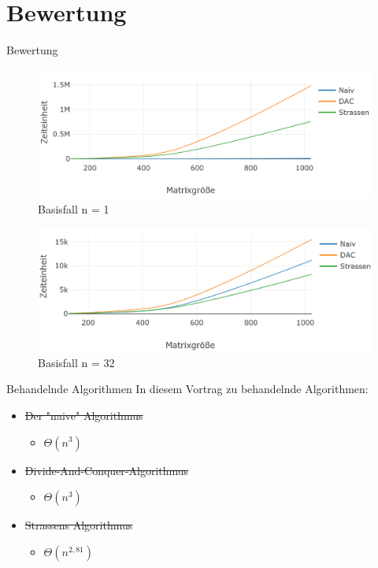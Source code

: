 \documentclass[aspectratio=169]{beamer}
\begin{document}
\section{Bewertung}
\begin{frame}{Bewertung}

     {
        \begin{figure}[H]
            \centering
            \includegraphics[width=\linewidth]{basisfallnot.png}
            \caption{Basisfall n = 1}
        \end{figure}
    }{
        \begin{figure}[H]
            \centering
            \includegraphics[width=\linewidth]{basisfallmod.png}
            \caption{Basisfall n = 32}
        \end{figure}
    }
    \pause[2]
\end{frame}

\begin{frame}{Behandelnde Algorithmen}
    In diesem Vortrag zu behandelnde Algorithmen:
    \begin{itemize}
        \item \st{Der "naive" Algorithmus}
        \begin{itemize}
            \item $\Theta(n^3)$
        \end{itemize}
        \item \st{Divide-And-Conquer-Algorithmus}
        \begin{itemize}
            \item $\Theta(n^3)$
        \end{itemize}
        \item \st{Strassens Algorithmus}
        \begin{itemize}
            \item $\Theta(n^{2,81})$
        \end{itemize}
    \end{itemize}
\end{frame}
\end{document}
